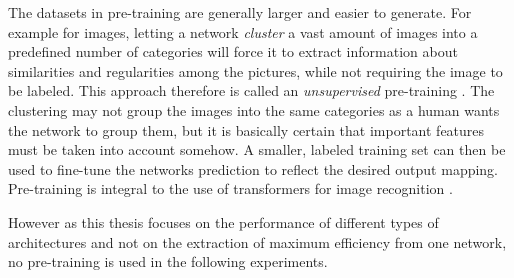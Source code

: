 The datasets in pre-training are generally larger and easier to generate. 
For example for images, letting a network \emph{cluster} a vast amount of images into a predefined number of categories will force it to extract information about similarities and regularities among the pictures, while not requiring the image to be labeled. This approach therefore is called an \emph{unsupervised} pre-training \cite{dinoPaper}. 
The clustering may not group the images into the same categories as a human wants the network to group them, but it is basically certain that important features must be taken into account somehow. 
A smaller, labeled training set can then be used to fine-tune the networks prediction to reflect the desired output mapping. 
Pre-training is integral to the use of transformers for image recognition \cite{imageWorth16x16}. 

However as this thesis focuses on the performance of different types of architectures and not on the extraction of maximum efficiency from one network, no pre-training is used in the following experiments.
